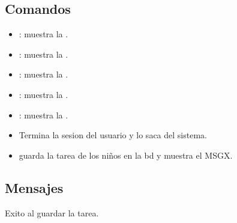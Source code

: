 \subsection{Comandos}
\begin{itemize}
	\item {}: muestra la .
        \item {}: muestra la .
        \item {}: muestra la .
        \item {}: muestra la .
        \item {}: muestra la .
        \item {}Termina la sesion del usuario y lo saca del sistema.
        \item {} guarda la tarea de los niños en la bd y muestra el MSGX.
\end{itemize}

\subsection{Mensajes}

\begin{Citemize}
	\item Exito al guardar la tarea.
\end{Citemize}

